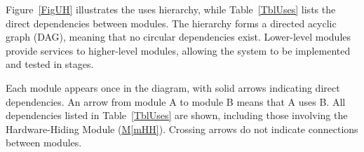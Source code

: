 \documentclass[10pt, titlepage]{article}
\newcommand{\mref}[1]{\texorpdfstring{\hyperref[md:#1]{M\ref*{#1}}}{M\ref*{#1}}}
\begin{document}
Figure~\ref{FigUH} illustrates the uses hierarchy, while
Table~\ref{TblUses} lists the direct dependencies between
modules. The hierarchy forms a directed acyclic graph (DAG),
meaning that no circular dependencies exist. Lower-level
modules provide services to higher-level modules, allowing
the system to be implemented and tested in stages.

Each module appears once in the diagram, with solid arrows
indicating direct dependencies. An arrow from module A
to module B means that A uses B. All dependencies listed
in Table~\ref{TblUses} are shown, including those involving
the Hardware-Hiding Module (\mref{mHH}). Crossing arrows
do not indicate connections between modules.

\end{document}
